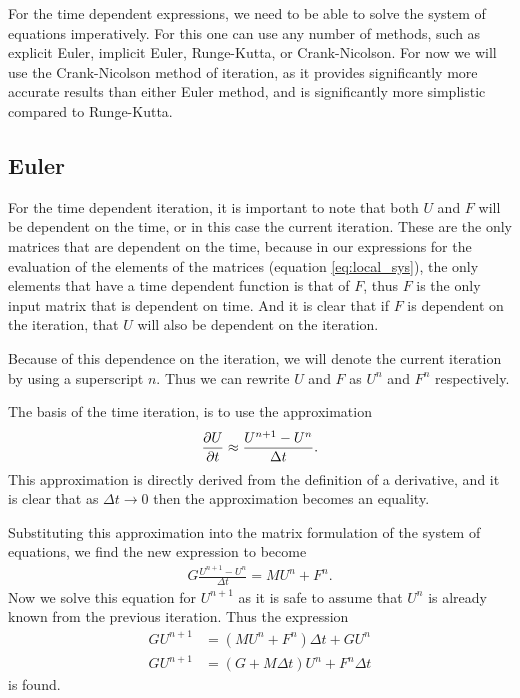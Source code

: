 \documentclass[../fem.tex]{subfiles}
\begin{document}
For the time dependent expressions, we need to be able to solve the system of
equations imperatively. For this one can use any number of methods, such as
explicit Euler, implicit Euler, Runge-Kutta, or Crank-Nicolson. For now we
will use the Crank-Nicolson method of iteration, as it provides significantly
more accurate results than either Euler method, and is significantly more
simplistic compared to Runge-Kutta.

\subsection{Euler}%
\label{sub:euler}

For the time dependent iteration, it is important to note that both $U$ and $F$
will be dependent on the time, or in this case the current iteration. These are
the only matrices that are dependent on the time, because in our expressions
for the evaluation of the elements of the matrices (equation
\ref{eq:local_sys}), the only elements that have a time dependent function is
that of $F$, thus $F$ is the only input matrix that is dependent on time. And
it is clear that if $F$ is dependent on the iteration, that $U$ will also be
dependent on the iteration.

Because of this dependence on the iteration, we will denote the current
iteration by using a superscript $n$. Thus we can rewrite $U$ and $F$ as $U^n$
and $F^n$ respectively.

The basis of the time iteration, is to use the approximation
\begin{align*}
  \frac{\partial U}{\partial t}\approx\frac{U^{n+1}-U^n}{\Delta t}.
\end{align*}
This approximation is directly derived from the definition of a derivative, and
it is clear that as $\Delta t\rightarrow 0$ then the approximation becomes an
equality.

Substituting this approximation into the matrix formulation of the system of
equations, we find the new expression to become
\begin{align*}
  G\frac{U^{n+1}-U^n}{\Delta t}=MU^n+F^n.
\end{align*}
Now we solve this equation for $U^{n+1}$ as it is safe to assume that $U^n$ is
already known from the previous iteration. Thus the expression
\begin{align*}
  GU^{n+1}&=\left(MU^n+F^n\right)\Delta t+GU^n\\
  GU^{n+1}&=\left(G+M\Delta t\right)U^n+F^n\Delta t
\end{align*}
is found.
\end{document}
